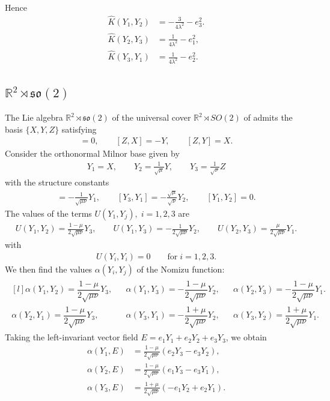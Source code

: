 \documentclass[12pt]{article}
\begin{document}
\noindent Hence
\begin{align*}
\widehat{K}(Y_1,Y_2) &=
-\frac{3}{4\lambda^2}-e_3^2. \\
\widehat{K}(Y_2,Y_3) &=
\frac{1}{4\lambda^2} - e_1^2, \\
\widehat{K}(Y_3,Y_1) &=
\frac{1}{4\lambda^2} - e_2^2.
\end{align*}

\subsection{$\mathbb{R}^2 \rtimes \mathfrak{so}(2)$}

\noindent The Lie algebra
$\mathbb{R}^2\rtimes\mathfrak{so}(2)$ of the universal cover $\mathbb{R}^2\rtimes SO(2)$ of  admits the basis $\{X,Y,Z\}$ satisfying
\begin{align*}
[X,Y]=0,\qquad [Z,X]=-Y,\qquad [Z,Y]=X.
\end{align*}
Consider the orthonormal Milnor base given by
\begin{align*}
Y_1=X,
\qquad
Y_2=\frac{1}{\sqrt{\mu}}Y,
\qquad
Y_3=\frac{1}{\sqrt{\nu}}Z
\end{align*}
with the structure constants
\begin{align*}
[Y_2,Y_3]
=
-\frac{1}{\sqrt{\mu\nu}}Y_1,
\qquad
[Y_3,Y_1]
=
-\frac{\sqrt{\mu}}{\sqrt{\nu}}Y_2,
\qquad
[Y_1,Y_2]=0.
\end{align*}
\noindent The values of the terms $U(Y_1,Y_j),\; i=1,2,3$ are
\begin{align*}
U(Y_1,Y_2)= \frac{1-\mu}{2\sqrt{\mu\nu}}Y_3,
\qquad
U(Y_1,Y_3)=-\frac{1}{2\sqrt{\mu\nu}}Y_2, \qquad 
U(Y_2,Y_3)= \frac{\mu}{2\sqrt{\mu\nu}}Y_1.
\end{align*}
with \begin{align*}
    U(Y_i,Y_i) = 0 \qquad \text{for}\; i=1,2,3.
\end{align*}
We then find the values $\alpha(Y_i,Y_j)$ of the Nomizu function:
\begin{align*}
\begin{matrix*}[l]
\alpha(Y_1,Y_2)=\dfrac{1-\mu}{2\sqrt{\mu\nu}}Y_3, &&
\alpha(Y_1,Y_3)=-\dfrac{1-\mu}{2\sqrt{\mu\nu}}Y_2, &&
\alpha(Y_2,Y_3)=-\dfrac{1-\mu}{2\sqrt{\mu\nu}}Y_1. \\[1em]
\alpha(Y_2,Y_1)=\dfrac{1-\mu}{2\sqrt{\mu\nu}}Y_3, &&
\alpha(Y_3,Y_1)=-\dfrac{1+\mu}{2\sqrt{\mu\nu}}Y_2, &&
\alpha(Y_3,Y_2)=\dfrac{1+\mu}{2\sqrt{\mu\nu}}Y_1.
\end{matrix*}
\end{align*}
Taking the left-invariant vector field $E = e_1Y_1 + e_2Y_2 + e_3Y_3$, we obtain
\begin{align*}
\alpha(Y_1,E) &= 
\frac{1-\mu}{2\sqrt{\mu\nu}}
\left(e_2Y_3-e_3Y_2\right), \\
\alpha(Y_2,E) &=
\frac{1-\mu}{2\sqrt{\mu\nu}}
\left(e_1Y_3-e_3Y_1\right), \\
\alpha(Y_3,E) &=
\frac{1+\mu}{2\sqrt{\mu\nu}}
\left(-e_1Y_2+e_2Y_1\right).
\end{align*}
\end{document}
